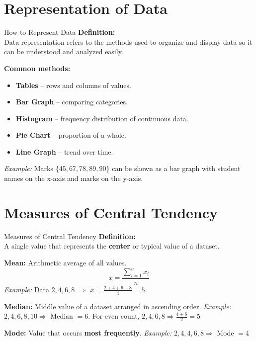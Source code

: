 \documentclass{beamer}
\begin{document}
\section{Representation of Data}
\begin{frame}{How to Represent Data}
\textbf{Definition:}\\[0.5mm]
Data representation refers to the methods used to organize and display data so it can be understood and analyzed easily.

\vspace{1.5mm}
\textbf{Common methods:}
\begin{itemize}
    \item \textbf{Tables} -- rows and columns of values.
    \item \textbf{Bar Graph} -- comparing categories.
    \item \textbf{Histogram} -- frequency distribution of continuous data.
    \item \textbf{Pie Chart} -- proportion of a whole.
    \item \textbf{Line Graph} -- trend over time.
\end{itemize}
\textit{Example:} Marks $\{45,67,78,89,90\}$ can be shown as a bar graph with student names on the x-axis and marks on the y-axis.
\end{frame}

\section{Measures of Central Tendency}

\begin{frame}{Measures of Central Tendency}
\textbf{Definition:}\\[0.5mm]
A single value that represents the \textbf{center} or typical value of a dataset.

\vspace{2mm}
\textbf{Mean:} Arithmetic average of all values.
\[
\bar{x} = \frac{\sum_{i=1}^{n} x_i}{n}
\]
\textit{Example:} Data $2,4,6,8$ $\Rightarrow$ $\bar{x} = \frac{2+4+6+8}{4} = 5$

\vspace{2mm}
\textbf{Median:} Middle value of a dataset arranged in ascending order.
\textit{Example:} $2,4,6,8,10 \Rightarrow$ Median $=6$. For even count, $2,4,6,8 \Rightarrow \frac{4+6}{2}=5$

\vspace{2mm}
\textbf{Mode:} Value that occurs \textbf{most frequently}.
\textit{Example:} $2,4,4,6,8 \Rightarrow$ Mode $=4$
\end{frame}
\end{document}
